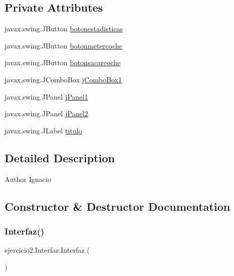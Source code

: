 \subsection*{Private Attributes}
\begin{DoxyCompactItemize}
\item 
javax.\+swing.\+J\+Button \mbox{\hyperlink{classejercicio2_1_1_interfaz_a7385c1fb6e098f60bb5a8b4b7a31fd65}{botonestadisticas}}
\item 
javax.\+swing.\+J\+Button \mbox{\hyperlink{classejercicio2_1_1_interfaz_a312037c2c5b2cd0f23fd65998314ee09}{botonmetercoche}}
\item 
javax.\+swing.\+J\+Button \mbox{\hyperlink{classejercicio2_1_1_interfaz_a643d25060e73ac4c53a95d7b4bfdae52}{botonsacarcoche}}
\item 
javax.\+swing.\+J\+Combo\+Box \mbox{\hyperlink{classejercicio2_1_1_interfaz_a132c36c6003bac5a001076557090fa40}{j\+Combo\+Box1}}
\item 
javax.\+swing.\+J\+Panel \mbox{\hyperlink{classejercicio2_1_1_interfaz_a7cb66fff39e6e8d10acc8ec7f1d42a70}{j\+Panel1}}
\item 
javax.\+swing.\+J\+Panel \mbox{\hyperlink{classejercicio2_1_1_interfaz_a6ef595f7c876b199b34095e19c5b206a}{j\+Panel2}}
\item 
javax.\+swing.\+J\+Label \mbox{\hyperlink{classejercicio2_1_1_interfaz_af6343959b01523a71cdf2296b61672e0}{titulo}}
\end{DoxyCompactItemize}


\subsection{Detailed Description}
\begin{DoxyAuthor}{Author}
Ignacio 
\end{DoxyAuthor}


\subsection{Constructor \& Destructor Documentation}
\mbox{\label{classejercicio2_1_1_interfaz_a4fd3bce20b745d1b20a97b7ee776f843}} 
\subsubsection{\texorpdfstring{Interfaz()}{Interfaz()}}
{\footnotesize\ttfamily ejercicio2.\+Interfaz.\+Interfaz (\begin{DoxyParamCaption}{ }\end{DoxyParamCaption})\hspace{0.3cm}{\ttfamily [inline]}}

